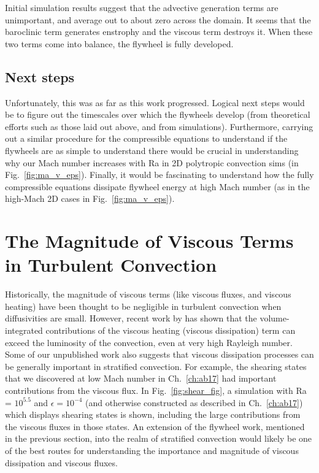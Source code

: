Initial simulation results suggest that the advective generation terms are unimportant, and average out to about zero across the domain.
It seems that the baroclinic term generates enstrophy and the viscous term destroys it.
When these two terms come into balance, the flywheel is fully developed.

\subsection{Next steps}
Unfortunately, this was as far as this work progressed.
Logical next steps would be to figure out the timescales over which the flywheels develop (from theoretical efforts such as those laid out above, and from simulations).
Furthermore, carrying out a similar procedure for the compressible equations to understand if the flywheels are as simple to understand there would be crucial in understanding why our Mach number increases with Ra in 2D polytropic convection sims (in Fig.~\ref{fig:ma_v_eps}).
Finally, it would be fascinating to understand how the fully compressible equations dissipate flywheel energy at high Mach number (as in the high-Mach 2D cases in Fig.~\ref{fig:ma_v_eps}).

\section{The Magnitude of Viscous Terms in Turbulent Convection}
\label{sec:unpub_viscous_terms}
Historically, the magnitude of viscous terms (like viscous fluxes, and viscous heating) have been thought to be negligible in turbulent convection when diffusivities are small.
However, recent work by \citet{currie&all2017} has shown that the volume-integrated contributions of the viscous heating (viscous dissipation) term can exceed the luminosity of the convection, even at very high Rayleigh number.
Some of our unpublished work also suggests that viscous dissipation processes can be generally important in stratified convection.
For example, the shearing states that we discovered at low Mach number in Ch.~\ref{ch:ab17} had important contributions from the viscous flux.
In Fig.~\ref{fig:shear_fig}, a simulation with Ra = $10^{5.5}$ and $\epsilon = 10^{-4}$ (and otherwise constructed as described in Ch.~\ref{ch:ab17}) which displays shearing states is shown, including the large contributions from the viscous fluxes in those states.
An extension of the flywheel work, mentioned in the previous section, into the realm of stratified convection would likely be one of the best routes for understanding the importance and magnitude of viscous dissipation and viscous fluxes.


